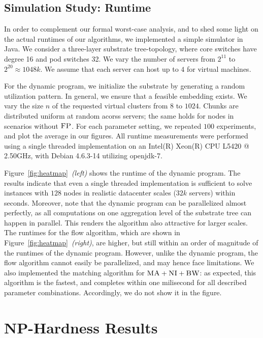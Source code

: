 \documentclass[preprint,12pt]{elsarticle}
\newcommand{\CC}{\textsc{NI}}
\newcommand{\FP}{\textsc{FP}}
\newcommand{\BW}{\textsc{BW}}
\newcommand{\MA}{\textsc{MA}}
\begin{document}
\subsection{Simulation Study: Runtime}

In order to complement our formal worst-case analysis,
and to shed some light on the actual runtimes of
our algorithms, 
we implemented a simple simulator in Java. 
We consider a three-layer substrate tree-topology,
where core switches have degree 16 and
pod switches 32. We vary the number
of servers from $2^{11}$ to $2^{20}\approx 1048k$.
We assume that each server can host  
up to $4$ for virtual machines. 

For the dynamic program, we initialize the substrate by generating a
random utilization pattern. In general, we ensure
that a feasible embedding exists. 
We vary the size $n$ of the 
requested virtual clusters from 
$8$ to $1024$. Chunks are distributed uniform at random acorss servers;
the same holds for nodes in scenarios without $\FP$. 
For each parameter setting, we repeated $100$ experiments,
and plot the average in our figures. 
All runtime measurements were performed using 
a single threaded implementation on an Intel(R) Xeon(R) CPU L5420  @ 2.50GHz, 
with Debian 4.6.3-14 utilizing openjdk-7.

Figure~\ref{fig:heatmap}~\textit{(left)} shows the runtime of the dynamic program. 
The results indicate that even a single threaded implementation 
is sufficient to solve instances with $128$ nodes in realistic datacenter scales
 ($32k$ servers) within seconds. 
 Moreover, note that the dynamic program can be parallelized almost perfectly, 
 as all computations on one aggregation level of the substrate tree can happen in parallel.
 This renders the algorithm also attractive for larger scales. 
 The runtimes for the flow algorithm, which are shown in Figure~\ref{fig:heatmap}~\textit{(right)}, are higher, but still within an order of magnitude of the runtimes of the dynamic program. 
 However, unlike the dynamic program, the flow algorithm cannot easily be parallelized,
 and may hence face limitations. 
 We also implemented the matching algorithm for $\MA + \CC + \BW$:
 as expected, this algorithm is the fastest, and completes 
 within one milisecond for all described parameter combinations. Accordingly,
 we do not show it in the figure.

\section{NP-Hardness Results}\label{sec:np}
\end{document}
